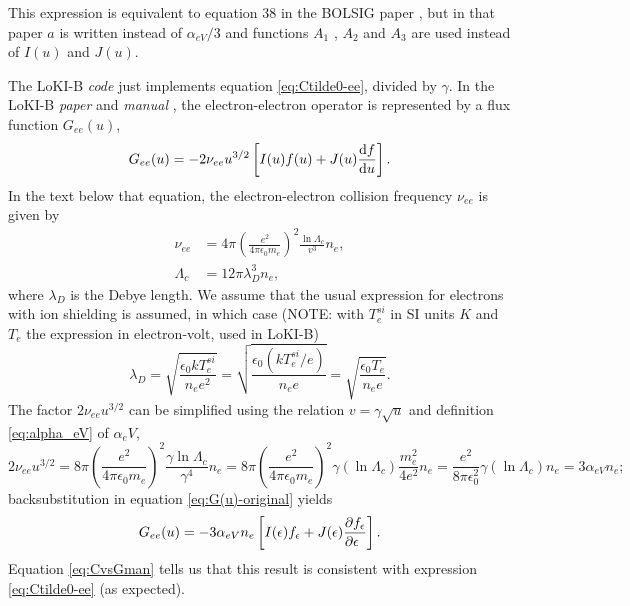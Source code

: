 \documentclass{book}
\begin{document}
This expression is equivalent to equation 38 in the BOLSIG paper \cite{Hagelaar2005},
but in that paper $a$ is written instead of $\alpha_{eV}/3$ and functions $A_1$ , $A_2$ and
$A_3$ are used instead of $I(u)$ and $J(u)$.

The LoKI-B {\em code} just implements equation \eqref{eq:Ctilde0-ee}, divided by $\gamma$.
In the LoKI-B {\em paper} \cite[eqn. 6d]{Tejero2019} and {\em manual} \cite[eq. 37a,38]{Manual_2_2_0},
the electron-electron operator is represented by a flux function $G_{ee}(u)$,
\begin{equation}
	G_{ee}(u) = -2\nu_{ee}u^{3/2}\left[I(u)f(u) + J(u)\DERIV{f}{u}\right].
	\label{eq:G(u)-original}
\end{equation}
In the text below that equation, the electron-electron collision frequency $\nu_{ee}$ is given by
\begin{align}
	\nu_{ee} &= 4\pi\left(\frac{e^2}{4\pi\epsilon_0 m_e}\right)^2\frac{\ln\Lambda_c}{v^3}n_e, \\
	\Lambda_c &= 12\pi\lambda_D^3n_e,
\end{align}
where $\lambda_D$ is the Debye length. We assume that the usual expression for electrons
with ion shielding is assumed, in which case (NOTE: with $T^{si}_e$ in SI units $\si{K}$
and $T_e$ the expression in electron-volt, used in LoKI-B)
\begin{equation}
	\lambda_D
	= \sqrt{\frac{\epsilon_0kT^{si}_e}{n_e e^2}}
	= \sqrt{\frac{\epsilon_0(kT^{si}_e/e)}{n_e e}}
	= \sqrt{\frac{\epsilon_0T_e}{n_e e}}.
\end{equation}
The factor $2\nu_{ee}u^{3/2}$ can be simplified using the relation $v=\gamma\sqrt{u}$
and definition \eqref{eq:alpha_eV} of $\alpha_eV$,
\begin{equation}
	2\nu_{ee}u^{3/2}
	= 8\pi\left(\frac{e^2}{4\pi\epsilon_0 m_e}\right)^2\frac{\gamma\ln\Lambda_c}{\gamma^4}n_e
	= 8\pi\left(\frac{e^2}{4\pi\epsilon_0 m_e}\right)^2\gamma\left(\ln\Lambda_c\right)\frac{m_e^2}{4e^2}n_e
	= \frac{e^2}{8\pi\epsilon_0^2}\gamma\left(\ln\Lambda_c\right) n_e
	= 3\alpha_{eV} n_e;
	\label{eq:g_ee-alpha}
\end{equation}
backsubstitution in equation \eqref{eq:G(u)-original} yields
\begin{equation}
	G_{ee}(u) = -3\alpha_{eV} n_e\left[I(\epsilon)f_\epsilon + J(\epsilon)\PDEV{f_\epsilon}{\epsilon}\right].
	\label{eq:G(u)}
\end{equation}
Equation \eqref{eq:CvsGman} tells us that this result is consistent with
expression \eqref{eq:Ctilde0-ee} (as expected).
\end{document}
